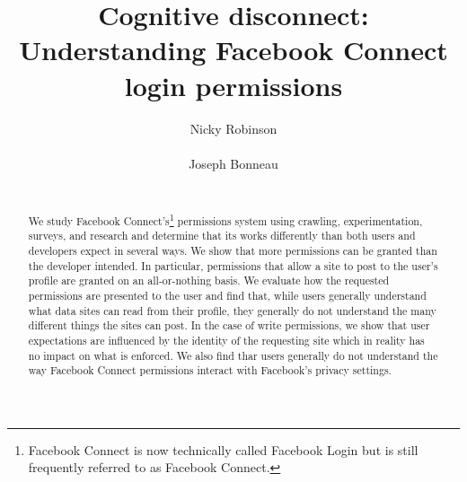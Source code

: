 \documentclass[10pt]{sig-alternate-10pt}
\begin{document}
\sloppy



\title{Cognitive disconnect:\\ Understanding Facebook Connect login permissions}

\author{
\alignauthor
Nicky Robinson\\
       \\
\alignauthor
Joseph Bonneau\\
       \\
}

\maketitle

\begin{abstract}
We study Facebook Connect's\footnote{Facebook Connect is now technically called Facebook Login but is still frequently referred to as Facebook Connect.} permissions system using crawling, experimentation, surveys, and research and determine that its works differently than both users and developers expect in several ways.
We show that more permissions can be granted than the developer intended.
In particular, permissions that allow a site to post to the user's profile are granted on an all-or-nothing basis.
We evaluate how the requested permissions are presented to the user and find that, while users generally understand what data sites can read from their profile, they generally do not understand the many different things the sites can post.
In the case of write permissions, we show that user expectations are influenced by the identity of the requesting site which in reality has no impact on what is enforced.
We also find thar users generally do not understand the way Facebook Connect permissions interact with Facebook's privacy settings.
\end{abstract}

\end{document}
